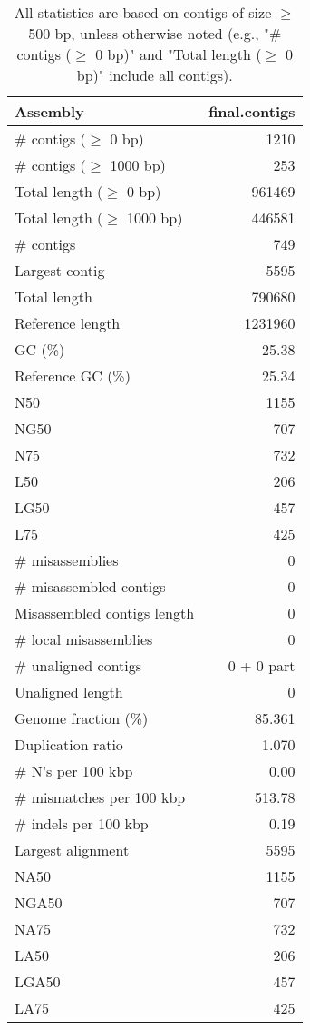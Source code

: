\documentclass[12pt,a4paper]{article}
\begin{document}
\begin{table}[ht]
\begin{center}
\caption{All statistics are based on contigs of size $\geq$ 500 bp, unless otherwise noted (e.g., "\# contigs ($\geq$ 0 bp)" and "Total length ($\geq$ 0 bp)" include all contigs).}
\begin{tabular}{|l*{1}{|r}|}
\hline
Assembly & final.contigs \\ \hline
\# contigs ($\geq$ 0 bp) & 1210 \\ \hline
\# contigs ($\geq$ 1000 bp) & 253 \\ \hline
Total length ($\geq$ 0 bp) & 961469 \\ \hline
Total length ($\geq$ 1000 bp) & 446581 \\ \hline
\# contigs & 749 \\ \hline
Largest contig & 5595 \\ \hline
Total length & 790680 \\ \hline
Reference length & 1231960 \\ \hline
GC (\%) & 25.38 \\ \hline
Reference GC (\%) & 25.34 \\ \hline
N50 & 1155 \\ \hline
NG50 & 707 \\ \hline
N75 & 732 \\ \hline
L50 & 206 \\ \hline
LG50 & 457 \\ \hline
L75 & 425 \\ \hline
\# misassemblies & 0 \\ \hline
\# misassembled contigs & 0 \\ \hline
Misassembled contigs length & 0 \\ \hline
\# local misassemblies & 0 \\ \hline
\# unaligned contigs & 0 + 0 part \\ \hline
Unaligned length & 0 \\ \hline
Genome fraction (\%) & 85.361 \\ \hline
Duplication ratio & 1.070 \\ \hline
\# N's per 100 kbp & 0.00 \\ \hline
\# mismatches per 100 kbp & 513.78 \\ \hline
\# indels per 100 kbp & 0.19 \\ \hline
Largest alignment & 5595 \\ \hline
NA50 & 1155 \\ \hline
NGA50 & 707 \\ \hline
NA75 & 732 \\ \hline
LA50 & 206 \\ \hline
LGA50 & 457 \\ \hline
LA75 & 425 \\ \hline
\end{tabular}
\end{center}
\end{table}
\end{document}
